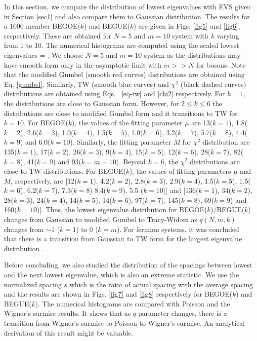In this section, we compare the distribution of lowest eigenvalues with EVS given in Section \ref{sec1} and also compare them to Gaussian distribution. The results for a 1000 member BEGOE($k$) and BEGUE($k$) are given in Figs. \ref{fig5} and \ref{fig6}, respectively. These are obtained for $N = 5$ and $m = 10$ system with $k$ varying from 1 to 10. The numerical histograms are computed using the scaled lowest eigenvalues 
\be
\tilde{\lambda} = \displaystyle{} \;.
\label{eq-lam-sc}
\ee 
We choose $N = 5$ and $m = 10$ system as the distributions may have smooth form only in the asymptotic limit with $m >> N$ for bosons.  Note that the modified Gumbel (smooth red curves) distributions are obtained using Eq. \eqref{gumbel}. Similarly, TW (smooth blue curves) and $\chi^2$  (black dashed curves) distributions are obtained using Eqs.~ \eqref{eq-tw} and \eqref{chi2} respectively.  For $k=1$, the distributions are close to Gaussian form. However, for $2 \leq k \leq 6$ the distributions are close to modified Gumbel form and it transitions to TW for $k = 10$. For BEGOE($k$), the values of the fitting parameter $\mu$ are  13($k=1$), 1.8($k=2$), 2.6($k=3$), 1.0($k=4$), 1.5($k=5$), 1.0($k=6$), 3.2($k=7$), 5.7($k=8$), 4.4($k=9$) and 6.0($k=10$). Similarly, the fitting parameter $M$ for $\chi^2$ distribution are 135($k=1$), 17($k=2$), 26($k=3$), 9($k=4$), 15($k=5$), 12($k=6$), 28($k=7$),  82($k=8$), 41($k=9$) and 93($k=m=10$). Beyond $k = 6$, the $\chi^2$ distributions are close to TW distributions.  For BEGUE($k$), the values of fitting parameters $\mu$ and $M$, respectively, are [12($k=1$), 4.2($k=2$), 2.8($k=3$), 2.9($k=4$), 1.5($k=5$), 1.5($k=6$), 6.2($k=7$), 7.3($k=8$) 8.4($k=9$), 5.5 ($k=10$)] and [136($k=1$), 34($k=2$), 28($k=3$), 24($k=4$), 14($k=5$), 14($k=6$), 97($k=7$), 145($k=8$), 69($k=9$) and 160($k=10$)]. Thus, the lowest eigenvalue distribution for BEGOE($k$)/BEGUE($k$) changes from Gaussian to modified Gumbel to Tracy-Widom as $q(N,m,k)$ changes from $\sim 1$ ($k = 1$) to 0 ($k = m$). For fermion systems, it was concluded that there is a transition from Gaussian to TW form for the largest eigenvalue distribution \cite{Be-23}.

Before concluding, we also studied the distribution of the spacings between lowest and the next lowest eigenvalue, which is also an extreme statistic. We use the normalized spacing $s$ which is the ratio of actual spacing with the average spacing and the results are shown in Figs. \ref{fig7} and \ref{fig8} respectively for BEGOE($k$) and BEGUE($k$). The numerical histograms are compared with Poisson and the Wigner's surmise results. It shows that as $q$ parameter changes, there is a transition from Wigner's surmise to Poisson to Wigner's surmise. An analytical derivation of this result might be valuable. 

